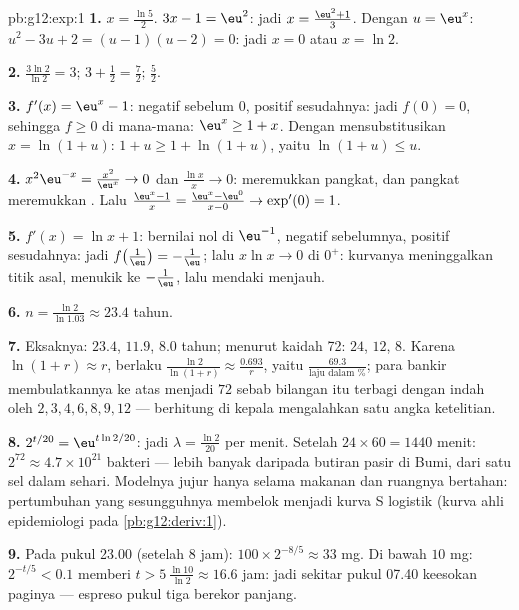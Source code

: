 \begin{solution}{pb:g12:exp:1}
\textbf{1.} $x = \frac{\ln 5}{2}$. \quad
$3x - 1 = \eu^2$: jadi $x = \frac{\eu^2 + 1}{3}$. \quad Dengan
$u = \eu^x$: $u^2 - 3u + 2 = (u - 1)(u - 2) = 0$: jadi $x = 0$ atau
$x = \ln 2$.

\textbf{2.} $\frac{3\ln 2}{\ln 2} = 3$; \quad
$3 + \frac12 = \frac72$; \quad $\frac52$.

\textbf{3.} $f'(x) = \eu^x - 1$: negatif sebelum $0$, positif
sesudahnya: jadi  $f(0) = 0$, sehingga $f \geq 0$ di mana-mana:
$\eu^x \geq 1 + x$. Dengan mensubstitusikan $x = \ln(1 + u)$:
$1 + u \geq 1 + \ln(1 + u)$, yaitu $\ln(1 + u) \leq u$.

\textbf{4.} $x^2\eu^{-x} = \frac{x^2}{\eu^x} \to 0$ dan
$\frac{\ln x}{x} \to 0$:  meremukkan pangkat, dan pangkat
meremukkan . Lalu $\frac{\eu^x - 1}{x} =
\frac{\eu^x - \eu^0}{x - 0} \to \exp'(0) = 1$.

\textbf{5.} $f'(x) = \ln x + 1$: bernilai nol di $\eu^{-1}$, negatif
sebelumnya, positif sesudahnya: jadi 
$f\!\left(\frac1\eu\right) = -\frac1\eu$; lalu
$x \ln x \to 0$ di $0^+$: kurvanya meninggalkan titik asal, menukik ke
$-\frac1\eu$, lalu mendaki menjauh.

\textbf{6.} $n = \frac{\ln 2}{\ln 1.03} \approx 23.4$ tahun.

\textbf{7.} Eksaknya: $23.4$, $11.9$, $8.0$ tahun; menurut kaidah 72:
$24$, $12$, $8$. Karena $\ln(1+r) \approx r$, berlaku
$\frac{\ln 2}{\ln(1+r)} \approx \frac{0.693}{r}$, yaitu
$\frac{69.3}{\text{laju dalam }\%}$; para bankir membulatkannya ke atas
menjadi $72$ sebab bilangan itu terbagi dengan indah oleh
$2, 3, 4, 6, 8, 9, 12$ --- berhitung di kepala mengalahkan satu angka
ketelitian.

\textbf{8.} $2^{t/20} = \eu^{t \ln 2 / 20}$:
jadi $\lambda = \frac{\ln 2}{20}$ per menit. Setelah
$24 \times 60 = 1440$ menit: $2^{72} \approx 4.7 \times
10^{21}$ bakteri --- lebih banyak daripada butiran pasir di Bumi,
dari satu sel dalam sehari. Modelnya jujur hanya selama makanan
dan ruangnya bertahan: pertumbuhan yang sesungguhnya membelok menjadi kurva
S logistik (kurva ahli epidemiologi pada \cref{pb:g12:deriv:1}).

\textbf{9.} Pada pukul 23.00 (setelah $8$ jam):
$100 \times 2^{-8/5} \approx 33$ mg. Di bawah $10$ mg:
$2^{-t/5} < 0.1$ memberi $t > 5\,\frac{\ln 10}{\ln 2} \approx
16.6$ jam: jadi sekitar pukul 07.40 keesokan paginya --- espreso pukul
tiga berekor panjang.


\end{solution}
